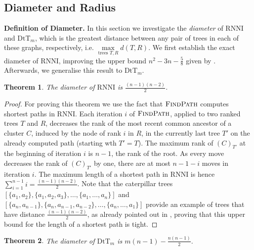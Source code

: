 \documentclass[11pt]{amsart}
\newtheorem{theorem}{Theorem}
\newcommand{\rnni}{\mathrm{RNNI}}
\newcommand{\findpath}{\textsc{FindPath}}
\newcommand{\dtt}{\mathrm{DtT}}
\newcommand{\summary}[1]{\textbf{#1}} %
\begin{document}
\subsection{Diameter and Radius}

\label{section:diameter}
\summary{Definition of Diameter.}
In this section we  investigate the \emph{diameter} of $\rnni$ and $\dtt_m$, which is the greatest distance between any pair of trees in each of these graphs, respectively, i.e. $\max\limits_{\text{trees }T,R}d(T,R)$.
We first establish the exact diameter of $\rnni$, improving the upper bound $n^2 - 3n - \frac{5}{8}$ given by \textcite{Gavryushkin2018-ol}.
Afterwards, we generalise this result to $\dtt_m$.

\begin{theorem}
	The diameter of $\rnni$ is $\frac{(n-1)(n-2)}{2}$.
	\label{thm:diameter_rnni}
\end{theorem}

\begin{proof}
	For proving this theorem we use the fact that $\findpath$ computes shortest paths in $\rnni$.
	Each iteration $i$ of $\findpath$, applied to two ranked trees $T$ and $R$, decreases the rank of the most recent common ancestor of a cluster $C$, induced by the node of rank $i$ in $R$, in the currently last tree $T'$ on the already computed path (starting wth $T' = T$).
	The maximum rank of $(C)_{T'}$ at the beginning of iteration $i$ is $n-1$, the rank of the root.
	As every move decreases the rank of $(C)_{T'}$ by one, there are at most $n-1-i$ moves in iteration $i$.
	The maximum length of a shortest path in $\rnni$ is hence $\sum \limits_{i = 1}^{n-1} i = \frac{(n-1)(n-2)}{2}$.
	Note that the caterpillar trees $[\{a_1, a_2\}, \{a_1, a_2, a_3\}, \ldots, \{a_1, \ldots, a_n\}]$ and $[\{a_n, a_{n-1}\}, \{a_n, a_{n-1}, a_{n-2}\}, \ldots, \{a_n, \ldots, a_1\}]$ provide an example of trees that have distance $\frac{(n-1)(n-2)}{2}$, as already pointed out in \autocite[Corollary 1]{Collienne2020-iu}, proving that this upper bound for the length of a shortest path is tight.
\end{proof}

\begin{theorem}
	The diameter of $\dtt_m$ is $m(n-1) - \frac{n(n-1)}{2}$.
	\label{thm:dtt_diameter}
\end{theorem}
\end{document}
